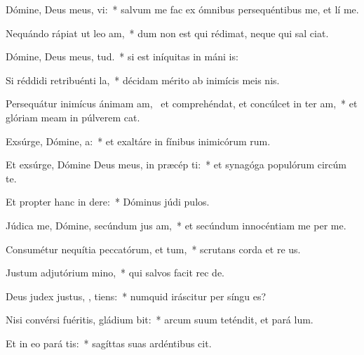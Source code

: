 \item Dómine, Deus meus,   vi:~* salvum me fac ex ómnibus persequéntibus me, et lí me.
\item Nequándo rápiat ut leo  am,~* dum non est qui rédimat, neque qui sal ciat.
\item Dómine, Deus meus,   tud.~* si est iníquitas in máni is:
\item Si réddidi retribuénti  la,~* décidam mérito ab inimícis meis nis.
\item Persequátur inimícus ánimam am,~\pscross{} et comprehéndat, et concúlcet in ter  am,~* et glóriam meam in púlverem cat.
\item Exsúrge, Dómine,   a:~* et exaltáre in fínibus inimicórum rum.
\item Et exsúrge, Dómine Deus meus, in præcép  ti:~* et synagóga populórum circúm te.
\item Et propter hanc in  dere:~* Dóminus júdi pulos.
\item Júdica me, Dómine, secúndum jus am,~* et secúndum innocéntiam me per me.
\item Consumétur nequítia peccatórum, et  tum,~* scrutans corda et re us.
\item Justum adjutórium   mino,~* qui salvos facit rec de.
\item Deus judex justus, ,  tiens:~* numquid iráscitur per síngu es?
\item Nisi convérsi fuéritis, gládium  bit:~* arcum suum teténdit, et pará lum.
\item Et in eo pará  tis:~* sagíttas suas ardéntibus cit.
